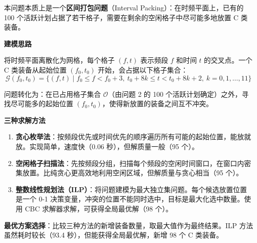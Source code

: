 
本问题本质上是一个\textbf{区间打包问题}（Interval Packing）：在时频平面上，已有的 100 个活跃计划占据了若干格子，需要在剩余的空闲格子中尽可能多地放置 C 类装备。

\textbf{建模思路}

将时频平面离散化为网格，每个格子 $(f, t)$ 表示频段 $f$ 和时间 $t$ 的交叉点。一个 C 类装备从起始位置 $(f_0, t_0)$ 开始，会占据以下格子集合：
\begin{equation}
    \mathcal{G}(f_0, t_0) = \{(f, t) \mid f_0 \leq f < f_0 + 3,\ t_0 + 8k \leq t < t_0 + 8k + 2,\ k = 0, 1, \ldots, 11\}
\end{equation}

问题转化为：在已占用格子集合 $\mathcal{O}$（由问题 2 的 100 个活跃计划确定）之外，寻找尽可能多的起始位置 $(f_0, t_0)$，使得新放置的装备之间互不冲突。

\textbf{三种求解方法}

\begin{enumerate}
    \item \textbf{贪心枚举法}：按频段优先或时间优先的顺序遍历所有可能的起始位置，能放就放。实现简单，速度快（0.06 秒），但解质量一般（95 个）。

    \item \textbf{空闲格子扫描法}：先按频段分组，扫描每个频段的空闲时间窗口，在窗口内密集放置。比纯贪心更高效地利用空闲区域，但解质量与贪心相当（95 个）。

    \item \textbf{整数线性规划法（ILP）}：将问题建模为最大独立集问题。每个候选放置位置是一个 0-1 决策变量，冲突的位置不能同时选中，目标是最大化选中数量。使用 CBC 求解器求解，可获得全局最优解（98 个）。
\end{enumerate}

\textbf{最优方案选择}：比较三种方法的新增装备数量，取最大值作为最终结果。ILP 方法虽然耗时较长（93.4 秒），但能获得全局最优解，新增 98 个 C 类装备。
